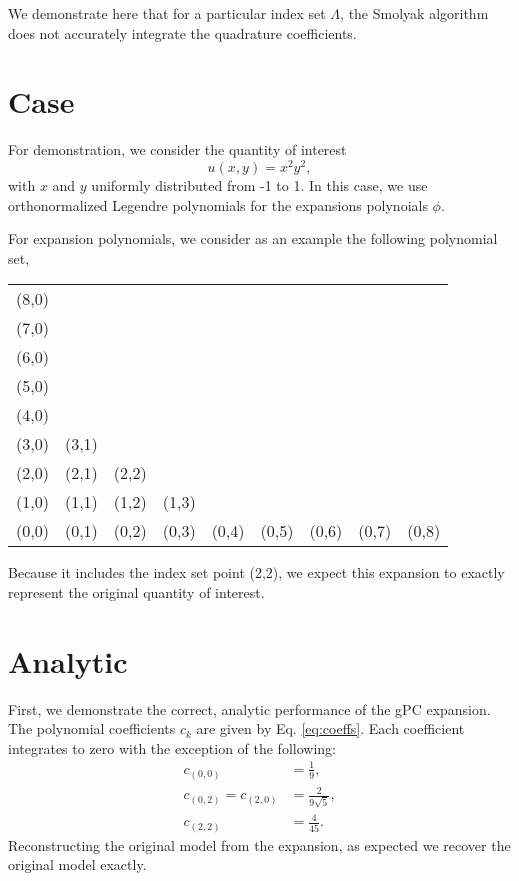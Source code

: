 \documentclass[11pt]{article}
\begin{document}
We demonstrate here that for a particular index set $\Lambda$, the Smolyak algorithm does not accurately
integrate the quadrature coefficients.

\section{Case}
For demonstration, we consider the quantity of interest
\begin{equation}
  u(x,y) = x^2 y^2,
\end{equation}
with $x$ and $y$ uniformly distributed from -1 to 1.  In this case, we use orthonormalized Legendre
polynomials for the expansions polynoials $\phi$.

For expansion polynomials, we consider as an example the following polynomial set,
\begin{table}[H]
  \centering
  \begin{tabular}{c c c c c c c c c}
    (8,0) &       &       &      &       &       &       &       &      \\
    (7,0) &       &       &      &       &       &       &       &      \\
    (6,0) &       &       &      &       &       &       &       &      \\
    (5,0) &       &       &      &       &       &       &       &      \\
    (4,0) &       &       &      &       &       &       &       &      \\
    (3,0) & (3,1) &       &      &       &       &       &       &      \\
    (2,0) & (2,1) & (2,2) &      &       &       &       &       &      \\
    (1,0) & (1,1) & (1,2) &(1,3) &       &       &       &       &      \\
    (0,0) & (0,1) & (0,2) &(0,3) & (0,4) & (0,5) & (0,6) & (0,7) & (0,8) 
  \end{tabular}
\end{table}
Because it includes the index set point (2,2), we expect this expansion to exactly represent the original
quantity of interest.

\section{Analytic}
First, we demonstrate the correct, analytic performance of the gPC expansion.  The polynomial coefficients
$c_k$ are given by Eq. \ref{eq:coeffs}.  Each coefficient integrates to zero with the exception of the
following:
\begin{align}
  c_{(0,0)} &= \frac{1}{9},\\
  c_{(0,2)} = c_{(2,0)} &= \frac{2}{9\sqrt{5}},\\
  c_{(2,2)} &= \frac{4}{45}.
\end{align}
Reconstructing the original model from the expansion, as expected we recover the original model exactly.
\end{document}
